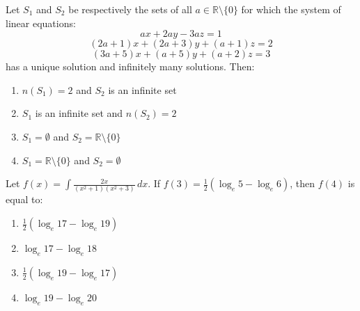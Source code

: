 \item Let $S_1$ and $S_2$ be respectively the sets of all $a \in \mathbb{R} \setminus \{0\}$ for which the system of linear equations:
\[
ax + 2ay - 3az = 1
\]
\[
(2a + 1)x + (2a + 3)y + (a + 1)z = 2
\]
\[
(3a + 5)x + (a + 5)y + (a + 2)z = 3
\]
has a unique solution and infinitely many solutions. Then:
\begin{enumerate}
    \item $n(S_1) = 2$ and $S_2$ is an infinite set
    \item $S_1$ is an infinite set and $n(S_2) = 2$
    \item $S_1 = \emptyset$ and $S_2 = \mathbb{R} \setminus \{0\}$
    \item $S_1 = \mathbb{R} \setminus \{0\}$ and $S_2 = \emptyset$
\end{enumerate}
\item Let $f(x) = \int \frac{2x}{(x^2 + 1)(x^2 + 3)} \, dx$. If $f(3) = \frac{1}{2} (\log_e 5 - \log_e 6)$, then $f(4)$ is equal to:
\begin{enumerate}
    \item $\frac{1}{2} (\log_e 17 - \log_e 19)$
    \item $\log_e 17 - \log_e 18$
    \item $\frac{1}{2} (\log_e 19 - \log_e 17)$
    \item $\log_e 19 - \log_e 20$
\end{enumerate}

